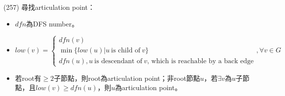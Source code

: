 \item \begin{theorem}{(257)} 尋找articulation point：\begin{itemize}
        \item $dfn$為DFS number。
        \item \begin{equation}
            low(v) = \begin{cases}
                dfn(v) \\
                \min\{low(u) | u \ \text{is child of} \ v\} \\
                dfn(u), u \ \text{is descendant of} \ v\text{, which is reachable by a back edge}
            \end{cases} , \forall v \in G
        \end{equation}
        \item 若root有$\ge 2$子節點，則root為articulation point；非root節點$u$，若$\exists v$為$u$子節點，且$low(v) \ge dfn(u)$，則$u$為articulation point。
    \end{itemize}
\end{theorem}
